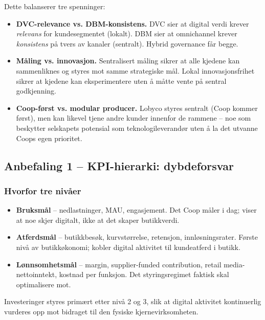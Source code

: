 Dette balanserer tre spenninger:
\begin{itemize}
  \item \textbf{DVC-relevance vs. DBM-konsistens.} DVC sier at digital
    verdi krever \emph{relevans} for kundesegmentet (lokalt). DBM sier
    at omnichannel krever \emph{konsistens} på tvers av kanaler
    (sentralt). Hybrid governance får begge.
  \item \textbf{Måling vs. innovasjon.} Sentralisert måling sikrer at
    alle kjedene kan sammenliknes og styres mot samme strategiske mål.
    Lokal innovasjonsfrihet sikrer at kjedene kan eksperimentere uten å
    måtte vente på sentral godkjenning.
  \item \textbf{Coop-først vs. modular producer.} Lobyco styres
    sentralt (Coop kommer først), men kan likevel tjene andre kunder
    innenfor de rammene -- noe som beskytter selskapets potensial som
    teknologileverandør uten å la det utvanne Coops egen prioritet.
\end{itemize}

\subsection{Anbefaling 1 -- KPI-hierarki: dybdeforsvar}

\subsubsection*{Hvorfor tre nivåer}
\begin{itemize}
  \item \textbf{Bruksmål} -- nedlastninger, MAU, engasjement. Det Coop
    måler i dag; viser at noe skjer digitalt, ikke at det skaper
    butikkverdi.
  \item \textbf{Atferdsmål} -- butikkbesøk, kurvstørrelse, retensjon,
    innløsningsrater. Første nivå av butikkøkonomi; kobler digital
    aktivitet til kundeatferd i butikk.
  \item \textbf{Lønnsomhetsmål} -- margin, supplier-funded contribution,
    retail media-nettoinntekt, kostnad per funksjon. Det styringsregimet
    faktisk skal optimalisere mot.
\end{itemize}
Investeringer styres primært etter nivå 2 og 3, slik at digital aktivitet
kontinuerlig vurderes opp mot bidraget til den fysiske kjernevirksomheten.

